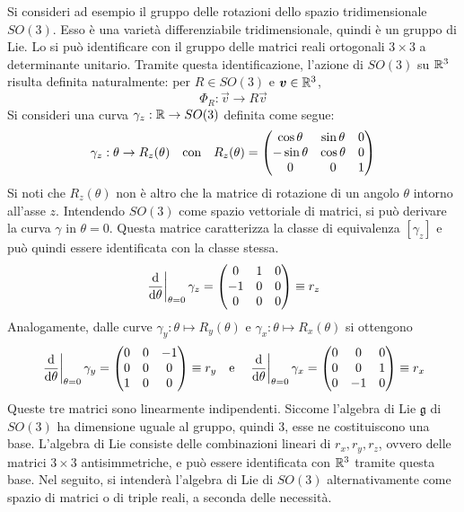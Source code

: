 Si consideri ad esempio il gruppo delle rotazioni dello spazio tridimensionale $SO(3)$. Esso è una varietà differenziabile tridimensionale, quindi è un gruppo di Lie. Lo si può identificare con il gruppo delle matrici reali ortogonali $3\times 3$ a determinante unitario. Tramite questa identificazione, l'azione di $SO(3)$ su $\mathbb{R}^3$ risulta definita naturalmente: per $R \in SO(3)$ e $\boldsymbol{v} \in \mathbb{R}^3$, 
\begin{equation*}
\Phi_R: \vec{v}\to R\vec{v}
\end{equation*} 
Si consideri una curva $\gamma_z: \mathbb{R} \to SO(3)$ definita come segue:
\begin{equation*}
\gamma_z: \theta \to R_z(\theta) \qqtext{con} R_z(\theta) = \pmqty{\cos \theta & \sin \theta & 0 \\ -\sin \theta & \cos \theta & 0 \\ 0 & 0 & 1}
\end{equation*}
Si noti che $R_z(\theta)$ non è altro che la matrice di rotazione di un angolo $\theta$ intorno all'asse $z$. Intendendo $SO(3)$ come spazio vettoriale di matrici, si può derivare la curva $\gamma$ in $\theta=0$. Questa matrice caratterizza la classe di equivalenza $[\gamma_z]$ e può quindi essere identificata con la classe stessa. 
\begin{equation*}
\eval{\dv{\theta}}_{\theta=0}\gamma_z = \pmqty{0 & 1 & 0 \\ -1 & 0 & 0 \\ 0 & 0 & 0} \defeq r_z
\end{equation*}
Analogamente, dalle curve $\gamma_y: \theta\mapsto R_y(\theta)$ e $\gamma_x: \theta \mapsto R_x(\theta)$ si ottengono 
\begin{equation*}
  \eval{\dv{\theta}}_{\theta=0}\gamma_y = \pmqty{0 & 0 & -1 \\ 0 & 0 & 0 \\ 1 & 0 & 0} \defeq r_y \qqtext{e} \eval{\dv{\theta}}_{\theta=0}\gamma_x = \pmqty{0 & 0 & 0 \\ 0 & 0 & 1 \\ 0 & -1 & 0} \defeq r_x
\end{equation*}
Queste tre matrici sono linearmente indipendenti. Siccome l'algebra di Lie $\mathfrak{g}$ di $SO(3)$ ha dimensione uguale al gruppo, quindi $3$, esse ne costituiscono una base. L'algebra di Lie consiste delle combinazioni lineari di $r_x, r_y, r_z$, ovvero delle matrici $3\times 3$ antisimmetriche, e può essere identificata con $\mathbb{R}^3$ tramite questa base.  Nel seguito, si intenderà l'algebra di Lie di $SO(3)$ alternativamente come spazio di matrici o di triple reali, a seconda delle necessità.

